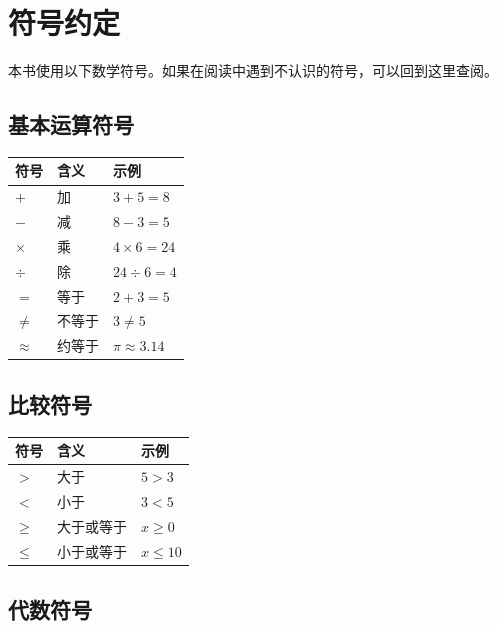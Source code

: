 \chapter*{符号约定}


本书使用以下数学符号。如果在阅读中遇到不认识的符号，可以回到这里查阅。

\section*{基本运算符号}


\begin{center}
\begin{tabular}{lll}
\toprule
符号 & 含义 & 示例 \\
\midrule
$+$ & 加 & $3 + 5 = 8$ \\
$-$ & 减 & $8 - 3 = 5$ \\
$\times$ & 乘 & $4 \times 6 = 24$ \\
$\div$ & 除 & $24 \div 6 = 4$ \\
$=$ & 等于 & $2 + 3 = 5$ \\
$\neq$ & 不等于 & $3 \neq 5$ \\
$\approx$ & 约等于 & $\pi \approx 3.14$ \\
\bottomrule
\end{tabular}
\end{center}


\section*{比较符号}


\begin{center}
\begin{tabular}{lll}
\toprule
符号 & 含义 & 示例 \\
\midrule
$>$ & 大于 & $5 > 3$ \\
$<$ & 小于 & $3 < 5$ \\
$\geq$ & 大于或等于 & $x \geq 0$ \\
$\leq$ & 小于或等于 & $x \leq 10$ \\
\bottomrule
\end{tabular}
\end{center}


\section*{代数符号}


